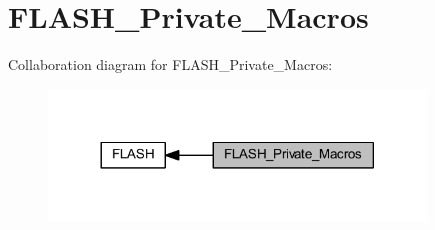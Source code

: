 \hypertarget{group___f_l_a_s_h___private___macros}{}\section{F\+L\+A\+S\+H\+\_\+\+Private\+\_\+\+Macros}
\label{group___f_l_a_s_h___private___macros}
Collaboration diagram for F\+L\+A\+S\+H\+\_\+\+Private\+\_\+\+Macros\+:
\nopagebreak
\begin{figure}[H]
\begin{center}
\leavevmode
\includegraphics[width=284pt]{group___f_l_a_s_h___private___macros}
\end{center}
\end{figure}
